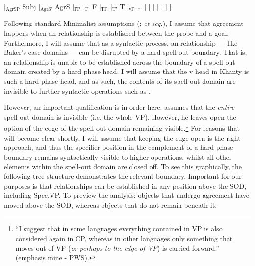 \documentclass[output=paper
,modfonts
,nonflat]{langsci/langscibook}
\begin{document}
\begin{exe}
\ex
{[$_{\textrm{AgrSP}}$ Subj [$_{\textrm{AgrS'}}$ AgrS [$_{\textrm{FP}}$  [$_{\textrm{F'}}$ F [$_{\textrm{TP}}$  [$_{\textrm{T'}}$ T [$_{\textrm{vP}}$ {\ldots} ] ] ] ] ] ] ]}
\end{exe}

\noindent Following standard Minimalist assumptions (\citealt{Chomsky2000,Chomsky2001}; \emph{et seq.}), I assume that agreement happens when an \agree {} relationship is established between the probe and a goal. 
Furthermore, I will assume that as a syntactic process, an \agree {} relationship --- like Baker's case domains --- can be disrupted by a hard spell-out boundary. That is, an \agree {} relationship is unable to be established across the boundary of a spell-out domain created by a hard phase head.
I will assume that the v head in Khanty is such a hard phase head, and as such, the contents of its spell-out domain are invisible to further syntactic operations such as \agree.

However, an important qualification is in order here: \citet{Baker2015} assumes that the \emph{entire} spell-out domain is invisible (i.e. the whole VP). However, he leaves open the option of the edge of the spell-out domain remaining visible.\footnote{``I suggest that in some languages everything contained in VP is also considered again in CP, whereas in other languages only something that moves out of VP (\emph{or perhaps to the edge of VP}) is carried forward.'' \parencite[][149]{Baker2015} (emphasis mine - PWS).} 
For reasons that will become clear shortly, I will assume that keeping the edge open is the right approach, and thus the specifier position in the complement of a hard phase boundary remains syntactically visible to higher operations, whilst all other elements within the spell-out domain are closed off. 
To see this graphically, the following tree structure demonstrates the relevant boundary. 
Important for our purposes is that \agree {} relationships can be established in any position above the SOD, including Spec,VP.
To preview the analysis: objects that undergo agreement have moved above the SOD, whereas objects that do not remain beneath it.
 
\begin{exe}
\ex \label{ex:khantyfp}
\end{exe}
\end{document}

